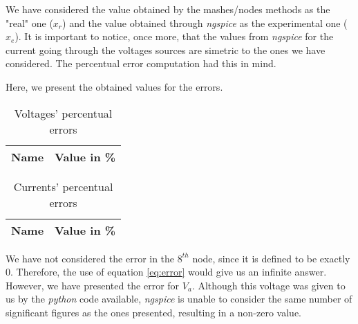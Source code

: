 We have considered the value obtained by the mashes/nodes methods as the "real" one ($x_r$) and the value obtained through \emph{ngspice} as the experimental one ($x_e$). It is important to notice, once more, that the values from \emph{ngspice} for the current going through the voltages sources are simetric to the ones we have considered. The percentual error computation had this in mind.

Here, we present the obtained values for the errors.

\begin{table}[H]
  \centering
  \begin{tabular}{|l|r|}
    \hline
    {\bf Name} & {\bf Value in \%} \\ \hline
    
  \end{tabular}
  \caption{Voltages' percentual errors}
  \label{tab:error_tensoes}
\end{table}



\begin{table}[H]
  \centering
  \begin{tabular}{|l|r|}
    \hline
    {\bf Name} & {\bf Value in \%} \\ \hline
    
  \end{tabular}
  \caption{Currents' percentual errors }
  \label{tab:error_current}
\end{table}

We have not considered the error in the $8^{th}$ node, since it is defined to be exactly 0. Therefore, the use of equation \ref{eq:error} would give us an infinite answer. However, we have presented the error for $V_a$. Although this voltage was given to us by the \emph{python} code available, \emph{ngspice} is unable to consider the same number of significant figures as the ones presented, resulting in a non-zero value.
